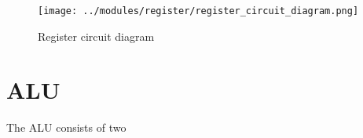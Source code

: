 \documentclass[12pt]{article}
\begin{document}
\begin{FlushLeft}
\begin{figure}[h]
  \begin{center}
    \texttt{[image: ../modules/register/register\_circuit\_diagram.png]}
    \caption{Register circuit diagram}
    \label{fig:register_circuit_diagram}
  \end{center}
\end{figure}



\section{ALU}
The ALU consists of two



\end{FlushLeft}

\clearpage
\end{document}
